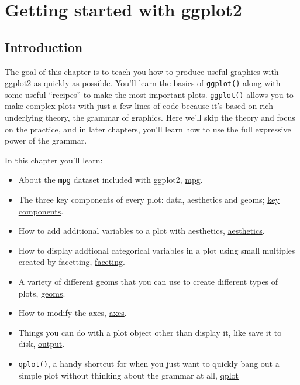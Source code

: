 \chapter{Getting started with ggplot2}\label{cha:getting-started}

\section{Introduction}

The goal of this chapter is to teach you how to produce useful graphics
with ggplot2 as quickly as possible. You'll learn the basics of
\texttt{ggplot()} along with some useful ``recipes'' to make the most
important plots. \texttt{ggplot()} allows you to make complex plots with
just a few lines of code because it's based on rich underlying theory,
the grammar of graphics. Here we'll skip the theory and focus on the
practice, and in later chapters, you'll learn how to use the full
expressive power of the grammar.

In this chapter you'll learn:

\begin{itemize}
\item
  About the \texttt{mpg} dataset included with ggplot2,
  \hyperref[sec:fuel-economy-data]{mpg}.
\item
  The three key components of every plot: data, aesthetics and geoms;
  \hyperref[sec:basic-use]{key components}.
\item
  How to add additional variables to a plot with aesthetics,
  \hyperref[aesthetics]{aesthetics}.
\item
  How to display addtional categorical variables in a plot using small
  multiples created by facetting,
  \hyperref[sec:qplot-faceting]{faceting}.
\item
  A variety of different geoms that you can use to create different
  types of plots, \hyperref[sec:plot-geoms]{geoms}.
\item
  How to modify the axes, \hyperref[sec:axes]{axes}.
\item
  Things you can do with a plot object other than display it, like save
  it to disk, \hyperref[sec:output]{output}.
\item
  \texttt{qplot()}, a handy shortcut for when you just want to quickly
  bang out a simple plot without thinking about the grammar at all,
  \hyperref[qplot]{qplot}
\end{itemize}



